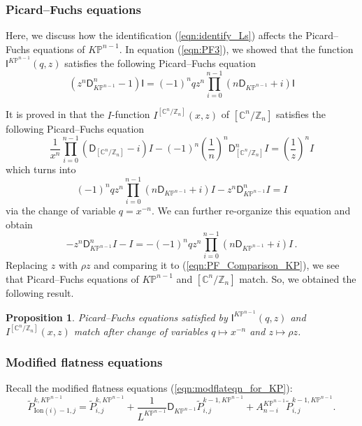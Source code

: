 \documentclass[12pt]{amsart}
\newtheorem{prop}{Proposition}[section]
\numberwithin{equation}{section}
\newcommand{\CnZn}{[\mathbb{C}^n/\mathbb{Z}_n]}
\newcommand{\KP}{K\mathbb{P}}
\begin{document}
\subsubsection{Picard--Fuchs equations}\label{sec:PF_iden}
Here, we discuss how the identification (\ref{eqn:identify_Ls}) affects the Picard--Fuchs equations of $\KP^{n-1}$. In equation (\ref{eqn:PF3}), we showed that the function $\mathsf{I}^{\KP^{n-1}}(q,z)$ satisfies the following Picard--Fuchs equation
\begin{equation}\label{eqn:PF_Comparison_KP}
\left(z^n\mathsf{D}_{\KP^{n-1}}^n-1\right)\mathsf{I}
=(-1)^nqz^n\prod_{i=0}^{n-1}\left(n\mathsf{D}_{\KP^{n-1}}+i\right)\mathsf{I}
\end{equation}

It is proved in \cite[Proposition 1.3]{gt} that the $I$-function $I^{\CnZn}(x,z)$ of $[\mathbb{C}^n/\mathbb{Z}_n]$ satisfies the following Picard--Fuchs equation
\begin{equation*}
\frac{1}{x^n}\prod_{i=0}^{n-1}\left(\mathsf{D}_{\CnZn}-i\right)I-(-1)^n\left(\frac{1}{n}\right)^n\mathsf{D}_{\CnZn}^nI=\left(\frac{1}{z}\right)^nI
\end{equation*}
which turns into
\begin{equation*}
(-1)^nqz^n\prod_{i=0}^{n-1}\left(n\mathsf{D}_{\KP^{n-1}}+i\right)I-z^n\mathsf{D}_{\KP^{n-1}}^nI=I
\end{equation*}
via the change of variable $q=x^{-n}$. We can further re-organize this equation and obtain
\begin{equation*}
-z^n\mathsf{D}_{\KP^{n-1}}^nI-I=-(-1)^nqz^n\prod_{i=0}^{n-1}\left(n\mathsf{D}_{\KP^{n-1}}+i\right)I\,.
\end{equation*}
Replacing $z$ with ${\rho}z$ and comparing it to (\ref{eqn:PF_Comparison_KP}), we see that Picard--Fuchs equations of $\KP^{n-1}$ and $\CnZn$ match. So, we obtained the following result.

\begin{prop}\label{prop:PF_Match}
Picard--Fuchs equations satisfied by $\mathsf{I}^{\KP^{n-1}}(q,z)$ and $I^{\CnZn}(x,z)$ match after change of variables $q\mapsto{x^{-n}}$ and $z\mapsto{\rho{z}}$.
\end{prop}

\subsubsection{Modified flatness equations}\label{sec:flatness_iden} 
Recall the modified flatness equations (\ref{eqn:modflateqn_for_KP}):
\begin{equation*}
\widetilde{P}_{\mathrm{Ion}(i)-1,j}^{k,\KP^{n-1}}=\widetilde{P}_{i,j}^{k,\KP^{n-1}}+\frac{1}{L^{\KP^{n-1}}}\mathsf{D}_{\KP^{n-1}}\widetilde{P}_{i,j}^{k-1,\KP^{n-1}}+A^{\KP^{n-1}}_{n-i}\widetilde{P}_{i,j}^{k-1,\KP^{n-1}}.
\end{equation*}
\end{document}

